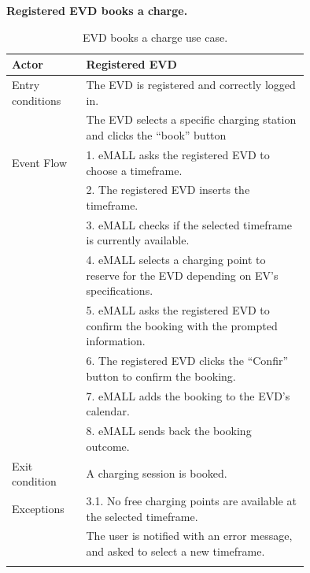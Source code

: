 \textbf{Registered EVD books a charge.}
\begin{center}
    \begin{longtable}{lp{0.75\linewidth}}
        \hline
        Actor            & Registered EVD                                                                             \\
        \hline
        Entry conditions & The EVD is registered and correctly logged in.                                             \\
        & The EVD selects a specific charging station and clicks the ``book'' button                 \\
        \hline
        Event Flow       & 1. eMALL asks the registered EVD to choose a timeframe.                                    \\
        & 2. The registered EVD inserts the timeframe.                                               \\
        & 3. eMALL checks if the selected timeframe is currently available.                          \\
        & 4. eMALL selects a charging point to reserve for the EVD depending on EV's specifications. \\
        & 5. eMALL asks the registered EVD to confirm the booking with the prompted information.     \\
        & 6. The registered EVD clicks the ``Confir'' button to confirm the booking.                 \\
        & 7. eMALL adds the booking to the EVD's calendar.                                           \\
        & 8. eMALL sends back the booking outcome.                                                   \\
        \hline
        Exit condition   & A charging session is booked.                                                              \\
        \hline
        Exceptions       & 3.1. No free charging points are available at the selected timeframe.                      \\
        & The user is notified with an error message, and asked to select a new timeframe.           \\
        \hline
        \caption{EVD books a charge use case.}
        \label{tab: EVD_booking_use_case}
    \end{longtable}
\end{center}

